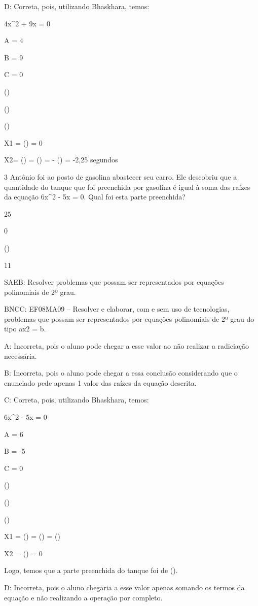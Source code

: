 {D: Correta, pois, utilizando Bhaskhara, temos:

4x^2 + 9x = 0

A = 4

B = 9

C = 0

()

()

()

X1 = () = 0

X2= () = () = - () =
-2,25 segundos

\num{3} Antônio foi ao posto de gasolina abastecer seu carro. Ele descobriu
que a quantidade do tanque que foi preenchida por gasolina é igual à
soma das raízes da equação 6x^2 - 5x = 0. Qual foi esta parte preenchida?
\item 25
\item 0
\item ()
\item 11

SAEB: Resolver problemas que possam ser representados por equações
polinomiais de 2º grau.

BNCC: EF08MA09 -- Resolver e elaborar, com e sem uso de tecnologias,
problemas que possam ser representados por equações polinomiais de 2º
grau do tipo ax2 = b.

A: Incorreta, pois o aluno pode chegar a esse valor ao não realizar a
radiciação necessária.

B: Incorreta, pois o aluno pode chegar a essa conclusão considerando que
o enunciado pede apenas 1 valor das raízes da equação descrita.

C: Correta, pois, utilizando Bhaskhara, temos:

6x^2 - 5x = 0

A = 6

B = -5

C = 0

()

()

()

X1 = () = () = ()

X2 = () = 0

Logo, temos que a parte preenchida do tanque foi de ().

D: Incorreta, pois o aluno chegaria a esse valor apenas somando os
termos da equação e não realizando a operação por completo.


}
